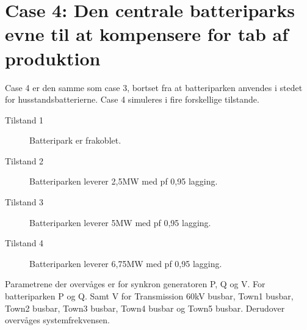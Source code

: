 \section{Case 4: Den centrale batteriparks evne til at kompensere for tab af produktion}
\label{SimCase4}
Case 4 er den samme som case 3, bortset fra at batteriparken anvendes i stedet for husstandsbatterierne.
Case 4 simuleres i fire forskellige tilstande.

\begin{description}
	\item[Tilstand 1] Batteripark er frakoblet.
	\item[Tilstand 2] Batteriparken leverer 2,5MW med pf 0,95 lagging.
	\item[Tilstand 3] Batteriparken leverer 5MW med pf 0,95 lagging.
	\item[Tilstand 4] Batteriparken leverer 6,75MW med pf 0,95 lagging.
\end{description}

Parametrene der overvåges er for synkron generatoren P, Q og V.
For batteriparken P og Q. Samt V for Transmission 60kV busbar, Town1 busbar, Town2 busbar, Town3 busbar, Town4 busbar og Town5 busbar.
Derudover overvåges systemfrekvensen.
